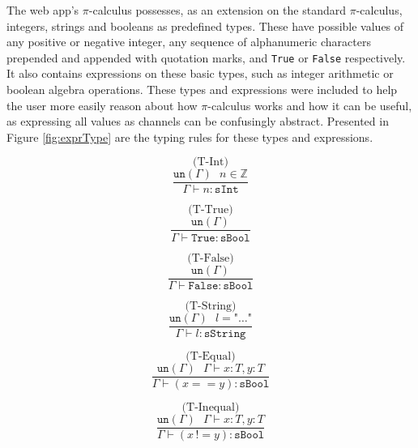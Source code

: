 \documentclass{l4proj}
\begin{document}
\quad The web app's $\pi$-calculus possesses, as an extension on the standard $\pi$-calculus, integers, strings and booleans as predefined types. These have possible values of any positive or negative integer, any sequence of alphanumeric characters prepended and appended with quotation marks, and \texttt{True} or \texttt{False} respectively. It also contains expressions on these basic types, such as integer arithmetic or boolean algebra operations. These types and expressions were included to help the user more easily reason about how $\pi$-calculus works and how it can be useful, as expressing all values as channels can be confusingly abstract. Presented in Figure \ref{fig:exprType} are the typing rules for these types and expressions.

\begin{figure}[H]
\begin{subfigure}{0.32\textwidth}
\[\text{(T-Int)}\]
\[\frac{\texttt{un}(\Gamma) \:\:\: n \in \mathbb{Z}}{\Gamma \vdash n : \texttt{sInt}}\]
\vspace{\fill}
\end{subfigure}
\begin{subfigure}{0.32\textwidth}
\[\text{(T-True)}\]
\[\frac{\texttt{un}(\Gamma)}{\Gamma \vdash \texttt{True} : \texttt{sBool}}\]
\vspace{\fill}
\end{subfigure}
\begin{subfigure}{0.32\textwidth}
\[\text{(T-False)}\]
\[\frac{\texttt{un}(\Gamma)}{\Gamma \vdash \texttt{False} : \texttt{sBool}}\]
\vspace{\fill}
\end{subfigure}
\begin{subfigure}{0.32\textwidth}
\[\text{(T-String)}\]
\[\frac{\texttt{un}(\Gamma) \:\:\: l = \texttt{"} \dots \texttt{"}}{\Gamma \vdash l : \texttt{sString}}\]
\vspace{\fill}
\end{subfigure}
\begin{subfigure}{0.32\textwidth}
\[\text{(T-Equal)}\]
\[\frac{\texttt{un}(\Gamma) \:\:\: \Gamma \vdash x:T, y:T}{\Gamma \vdash (x == y) : \texttt{sBool}}\]
\vspace{\fill}
\end{subfigure}
\begin{subfigure}{0.32\textwidth}
\[\text{(T-Inequal)}\]
\[\frac{\texttt{un}(\Gamma) \:\:\: \Gamma \vdash x:T, y:T}{\Gamma \vdash (x\,!\!= y) : \texttt{sBool}}\]
\vspace{\fill}
\end{subfigure}

\end{figure}
\end{document}

